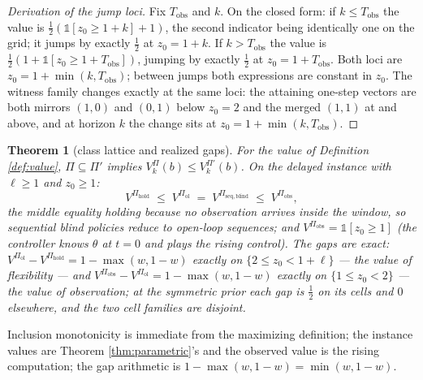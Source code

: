 \documentclass[10pt,twocolumn]{article}
\theoremstyle{plain}
\newtheorem{theorem}{Theorem}
\theoremstyle{definition}
\theoremstyle{remark}
\begin{document}
\begin{proof}[Derivation of the jump loci]
Fix \(T_{\mathrm{obs}}\) and \(k\). On the closed form: if
\(k \le T_{\mathrm{obs}}\) the value is
\(\tfrac{1}{2}(\mathbb{1}[z_{0} \ge 1 + k] + 1)\), the second indicator
being identically one on the grid; it jumps by exactly \(\tfrac{1}{2}\)
at \(z_{0} = 1 + k\). If \(k > T_{\mathrm{obs}}\) the value is
\(\tfrac{1}{2}(1 + \mathbb{1}[z_{0} \ge 1 + T_{\mathrm{obs}}])\),
jumping by exactly \(\tfrac{1}{2}\) at \(z_{0} = 1 + T_{\mathrm{obs}}\).
Both loci are \(z_{0} = 1 + \min(k, T_{\mathrm{obs}})\); between jumps
both expressions are constant in \(z_{0}\). The witness family changes
exactly at the same loci: the attaining one-step vectors are both
mirrors \((1, 0)\) and \((0, 1)\) below \(z_{0} = 2\) and the merged
\((1, 1)\) at and above, and at horizon \(k\) the change
sits at \(z_{0} = 1 + \min(k, T_{\mathrm{obs}})\).
\end{proof}

\begin{theorem}[class lattice and realized gaps]\label{thm:lattice}
For the value of Definition \ref{def:value}, \(\Pi \subseteq \Pi'\)
implies \(V^{\Pi}_{k}(b) \le V^{\Pi'}_{k}(b)\). On the delayed
instance with \(\ell \ge 1\) and \(z_{0} \ge 1\):
\[
V^{\Pi_{\mathrm{hold}}} \;\le\; V^{\Pi_{\mathrm{ol}}}
\;=\; V^{\Pi_{\mathrm{seq, blind}}}
\;\le\; V^{\Pi_{\mathrm{obs}}},
\]
the middle equality holding because no observation arrives inside the
window, so sequential blind policies reduce to open-loop sequences; and
\(V^{\Pi_{\mathrm{obs}}} = \mathbb{1}[z_{0} \ge 1]\) (the controller
knows \(\theta\) at \(t = 0\) and plays the rising control). The gaps
are exact: \(V^{\Pi_{\mathrm{ol}}} - V^{\Pi_{\mathrm{hold}}} =
1 - \max(w, 1 - w)\) exactly on \(\{2 \le z_{0} < 1 + \ell\}\) ---
the \emph{value of flexibility} --- and
\(V^{\Pi_{\mathrm{obs}}} - V^{\Pi_{\mathrm{ol}}} = 1 - \max(w, 1 -
w)\) exactly on \(\{1 \le z_{0} < 2\}\) --- the \emph{value of
observation}; at the symmetric prior each gap is \(\tfrac12\) on its
cells and \(0\) elsewhere, and the two cell families are disjoint.
\end{theorem}

Inclusion monotonicity is immediate from the maximizing definition; the
instance values are Theorem \ref{thm:parametric}'s and the observed
value is the rising computation; the gap arithmetic is
\(1 - \max(w, 1 - w) = \min(w, 1 - w)\).
\end{document}
